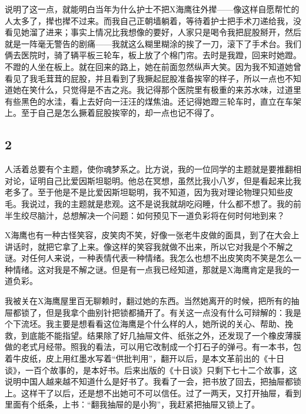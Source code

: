 说明了这一点，就能明白当年为什么护士不把X海鹰往外撵——像这样自愿帮忙的人太多了，撵也撵不过来。而我自己正朝墙躺着，等待着护士把手术刀递给我，没看见她溜了进来；事实上情况比我想像的要好，人家只是喝令我把屁股掰开，然后就是一阵毫无警告的剧痛——我就这么糊里糊涂的挨了一刀，滚下了手术台。我们俩去医院时，骑了辆平板三轮车，板上放了个棉门帘。去时是我蹬，回来时她蹬。不蹬的人坐在板上。就在回来的路上，她在前面忽然纵声大笑。因为我不知道她曾看见了我毛茸茸的屁股，并且看到了我撅起屁股准备挨宰的样子，所以一点也不知道她在笑什么，只觉得是不吉之兆。我记得那个医院里有极重的来苏水味，过道里有些黑色的水洼，看上去好向一汪汪的煤焦油。还记得她蹬三轮车时，直立在车架上。至于自己是怎么撅着屁股挨宰的，却一点也记不得了。 

\subsection{2} 

人活着总要有个主题，使你魂梦系之。比方说，我的一位同学的主题就是要推翻相对论，证明自己比爱因斯坦聪明。他总在冥想，虽然比我小八岁，但是看起来比我老多了。至于他是不是比爱因斯坦聪明，我不知道，因为我对理论物理只知些皮毛。我说过，我的主题就是悲观。这不是说我就胡吃闷睡，什么都不想了。我的前半生绞尽脑汁，总想解决一个问题：如何预见下一道负彩将在何时何地到来？ 

X海鹰也有一种古怪笑容，皮笑肉不笑，好像一张老牛皮做的面具，到了在大会上讲话时，就把它拿了上来。像这样的笑容我就做不出来，所以它对我是个不解之谜。对任何人来说，一种表情代表一种情绪。我怎么也想不出皮笑肉不笑是怎么一种情绪。这对我是不解之谜。但是有一点我已经知道，那就是X海鹰肯定是我的一道负彩。 

我被关在X海鹰屋里百无聊赖时，翻过她的东西。当然她离开的时候，把所有的抽屉都锁了，但是我拿个曲别针把锁都捅开了。有关这一点没有什么可辩解的：我是个下流坯。我主要是想看看这位海鹰是个什么样的人，她所说的关心、帮助、挽救，到底能不能指望。结果除了好几抽屉文件、纸张之外，还发现了一个橡皮薄膜做的老式月经带。照我的看法，可以用它改制成一个打石子的弹弓。有一本书，包着牛皮纸，皮上用红墨水写着“供批判用”，翻开以后，是本文革前出的《十日谈》，一百个故事的，是本好书。后来出版的《十日谈》只剩下七十二个故事，这说明中国人越来越不知道什么是好书了。我看了一会，把书放了回去，把抽屉都锁上。这样干了以后，还是想不出她可不可以信任。过了一两天，又打开抽屉，看到里面有个纸条，上书：“翻我抽屉的是小狗”，我赶紧把抽屉又锁上了。 


